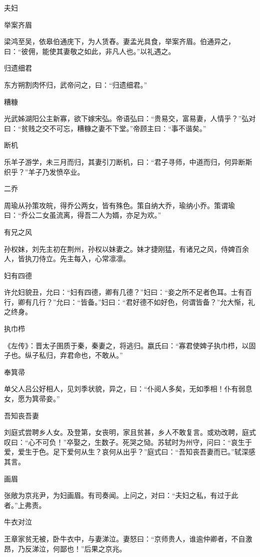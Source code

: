 \documentclass[a4paper,12pt,UTF8,twoside]{ctexbook}
\begin{document}
    夫妇
    
    举案齐眉
    
    梁鸿至吴，依皋伯通庑下，为人赁舂。妻孟光具食，举案齐眉。伯通异之，曰：“彼佣，能使其妻敬之如此，非凡人也。”以礼遇之。
    
    归遗细君
    
    东方朔割肉怀归，武帝问之，曰：“归遗细君。”
    
    糟糠
    
    光武姊湖阳公主新寡，欲下嫁宋弘。帝语弘曰：“贵易交，富易妻，人情乎？”弘对曰：“贫贱之交不可忘，糟糠之妻不下堂。”帝顾主曰：“事不谐矣。”
    
    断机
    
    乐羊子游学，未三月而归，其妻引刀断机，曰：“君子寻师，中道而归，何异断斯织乎？”羊子乃发愤卒业。
    
    二乔
    
    周瑜从孙策攻皖，得乔公两女，皆有殊色。策自纳大乔，瑜纳小乔。策谓瑜曰：“乔公二女虽流离，得吾二人为婿，亦足为欢。”
    
    有兄之风
    
    孙权妹，刘先主初在荆州，孙权以妹妻之。妹才捷刚猛，有诸兄之风，侍婢百余人，皆执刀侍立。先主每入，心常凛凛。
    
    妇有四德
    
    许允妇貌丑，允曰：“妇有四德，卿有几德？”妇曰：“妾之所不足者色耳。士有百行，卿有几行？”允曰：“皆备。”妇曰：“君好德不如好色，何谓皆备？”允大惭，礼之终身。
    
    执巾栉
    
    《左传》：晋太子圉质于秦，秦妻之，将逃归。嬴氏曰：“寡君使婢子执巾栉，以固子也。纵子私归，弃君命也，不敢从。”
    
    奉箕帚
    
    单父人吕公好相人，见刘季状貌，异之，曰：“仆阅人多矣，无如季相！仆有弱息女，愿为箕帚妾。”
    
    吾知丧吾妻
    
    刘庭式尝聘乡人女。及登第，女丧明，家且贫甚，乡人不敢复言。或劝改聘，庭式叹曰：“心不可负！”卒娶之，生数子。死哭之恸。苏轼时为州守，问曰：“哀生于爱，爱生于色。足下爱何从生？哀何从出乎？”庭式曰：“吾知丧吾妻而已。”轼深感其言。
    
    画眉
    
    张敞为京兆尹，为妇画眉。有司奏闻。上问之，对曰：“夫妇之私，有过于此者。”上弗责。
    
    牛衣对泣
    
    王章家贫无被，卧牛衣中，与妻涕泣。妻怒曰：“京师贵人，谁逾仲卿者，不自激昂，乃反涕泣，何鄙也！”后果之京兆。
    
\end{document}
